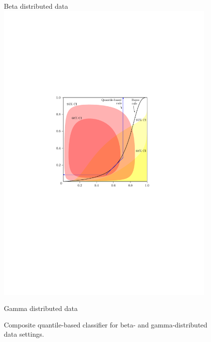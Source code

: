\begin{figure}[ht]
  \caption{Composite quantile-based classifier for beta- and gamma-distributed
    data settings.}
  \label{fig:beta-and-gamma}
  \centering
  \vspace{5mm}

  \begin{minipage}[t]{0.49\linewidth} \vspace{0mm}
    \centering
    Beta distributed data \\[2ex]
    \includegraphics[width=0.975\textwidth]{beta_cqc}
  \end{minipage}
  \begin{minipage}[t]{0.49\linewidth} \vspace{0mm}
    \centering
    Gamma distributed data \\[2ex]

\end{minipage}
\end{figure}

